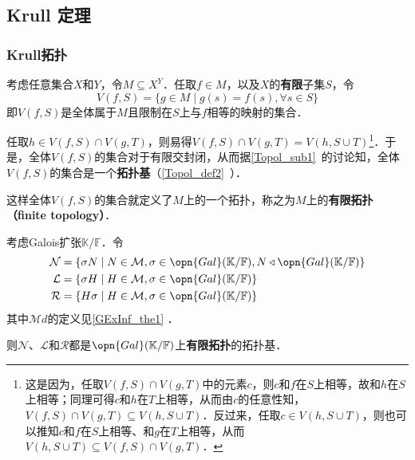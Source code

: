 \subsection{Krull 定理}\label{GExInf_sub1}


\subsubsection{Krull拓扑}

考虑任意集合$X$和$Y$，令$M\subseteq X^Y$．任取$f\in M$，以及$X$的\textbf{有限}子集$S$，令
\begin{equation}
V(f, S) = \{g\in M\mid g(s)=f(s), \forall s\in S\}
\end{equation}
即$V(f, S)$是全体属于$M$且限制在$S$上与$f$相等的映射的集合．

任取$h\in V(f, S)\cap V(g, T)$，则易得$V(f, S)\cap V(g, T) = V(h, S\cup T)$\footnote{这是因为，任取$V(f, S)\cap V(g, T)$中的元素$c$，则$c$和$f$在$S$上相等，故和$h$在$S$上相等；同理可得$c$和$h$在$T$上相等，从而由$c$的任意性知，$V(f, S)\cap V(g, T)\subseteq V(h, S\cup T)$．反过来，任取$c\in V(h, S\cup T)$，则也可以推知$c$和$f$在$S$上相等、和$g$在$T$上相等，从而$V(h, S\cup T)\subseteq V(f, S)\cap V(g, T)$．}．于是，全体$V(f, S)$的集合对于有限交封闭，从而据\autoref{Topol_sub1}~的讨论知，全体$V(f, S)$的集合是一个\textbf{拓扑基}（\autoref{Topol_def2}~）．

这样全体$V(f, S)$的集合就定义了$M$上的一个拓扑，称之为$M$上的\textbf{有限拓扑（finite topology）}．



\begin{theorem}{}\label{GExInf_the2}
考虑Galois扩张$\mathbb{K}/\mathbb{F}$．令
\begin{equation}\label{GExInf_eq1}
\begin{aligned}
\mathcal{N} &= \{\sigma N\mid N\in\mathcal{M}, \sigma\in\opn{Gal}(\mathbb{K}/\mathbb{F}), N\triangleleft\opn{Gal}(\mathbb{K}/\mathbb{F})\}\\
\mathcal{L} &= \{\sigma H\mid H\in\mathcal{M}, \sigma\in\opn{Gal}(\mathbb{K}/\mathbb{F})\}\\
\mathcal{R} &= \{H\sigma \mid H\in\mathcal{M}, \sigma\in\opn{Gal}(\mathbb{K}/\mathbb{F})\}
\end{aligned}
\end{equation}
其中$\mathcal{M}d$的定义见\autoref{GExInf_the1} ．

则$\mathcal{N}$、$\mathcal{L}$和$\mathcal{R}$都是$\opn{Gal}(\mathbb{K}/\mathbb{F})$上\textbf{有限拓扑}的拓扑基．
\end{theorem}

